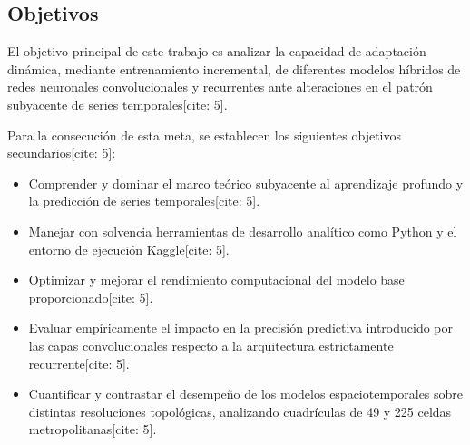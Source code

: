 \subsection{Objetivos}
\label{sec:objetivos}
El objetivo principal de este trabajo es analizar la capacidad de adaptación dinámica, mediante entrenamiento incremental, de diferentes modelos híbridos de redes neuronales convolucionales y recurrentes ante alteraciones en el patrón subyacente de series temporales[cite: 5].

Para la consecución de esta meta, se establecen los siguientes objetivos secundarios[cite: 5]:
\begin{itemize}
	\item Comprender y dominar el marco teórico subyacente al aprendizaje profundo y la predicción de series temporales[cite: 5].
	\item Manejar con solvencia herramientas de desarrollo analítico como Python y el entorno de ejecución Kaggle[cite: 5].
	\item Optimizar y mejorar el rendimiento computacional del modelo base proporcionado[cite: 5].
	\item Evaluar empíricamente el impacto en la precisión predictiva introducido por las capas convolucionales respecto a la arquitectura estrictamente recurrente[cite: 5].
	\item Cuantificar y contrastar el desempeño de los modelos espaciotemporales sobre distintas resoluciones topológicas, analizando cuadrículas de 49 y 225 celdas metropolitanas[cite: 5].
\end{itemize}

